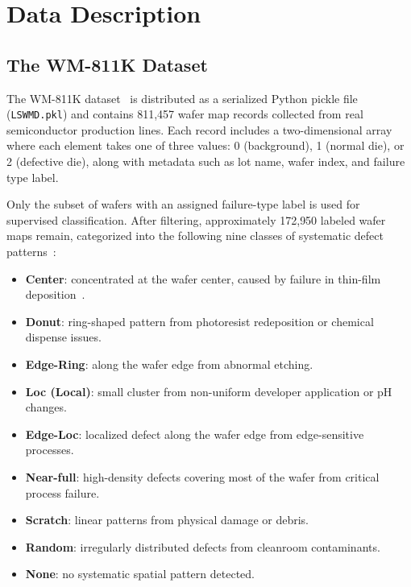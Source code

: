 \documentclass[conference]{IEEEtran}
\begin{document}
\section{Data Description}
\label{sec:data}

\subsection{The WM-811K Dataset}

The WM-811K dataset~\cite{wu2015} is distributed as a serialized Python
pickle file (\texttt{LSWMD.pkl}) and contains 811{,}457 wafer map records
collected from real semiconductor production lines. Each record includes a
two-dimensional array where each element takes one of three values: 0
(background), 1 (normal die), or 2 (defective die), along with metadata such
as lot name, wafer index, and failure type label.

Only the subset of wafers with an assigned failure-type label is used for
supervised classification. After filtering, approximately 172{,}950 labeled
wafer maps remain, categorized into the following nine classes of systematic
defect patterns~\cite{chen2023,weng2010}:

\begin{itemize}
    \item \textbf{Center}: concentrated at the wafer center, caused by
          failure in thin-film deposition~\cite{chen2021}.
    \item \textbf{Donut}: ring-shaped pattern from photoresist redeposition or
          chemical dispense issues.
    \item \textbf{Edge-Ring}: along the wafer edge from abnormal etching.
    \item \textbf{Loc (Local)}: small cluster from non-uniform developer
          application or pH changes.
    \item \textbf{Edge-Loc}: localized defect along the wafer edge from
          edge-sensitive processes.
    \item \textbf{Near-full}: high-density defects covering most of the wafer
          from critical process failure.
    \item \textbf{Scratch}: linear patterns from physical damage or debris.
    \item \textbf{Random}: irregularly distributed defects from cleanroom
          contaminants.
    \item \textbf{None}: no systematic spatial pattern detected.
\end{itemize}
\end{document}
